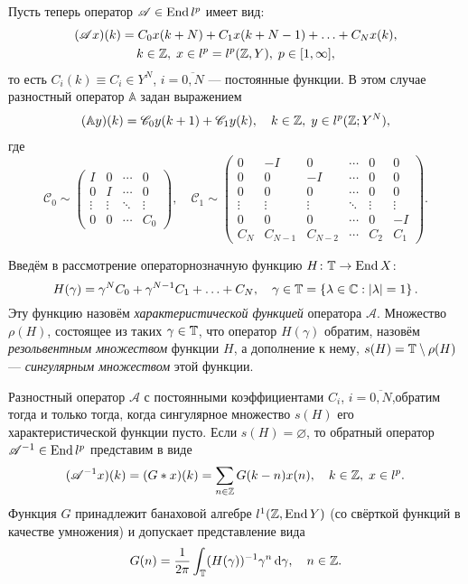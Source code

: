 Пусть теперь оператор $\mathcal A \in \operatorname{End}{l^p}$ имеет вид:
\begin{gather*}
    (\mathcal A x)(k) = C_0 x(k + N) + C_1 x(k + N - 1) + \dotsc + C_N x(k), \\
    k \in \mathbb{Z}, \; x \in l^p = l^p(\mathbb{Z}, Y), \; p \in [1, \infty],
\end{gather*}
то есть $C_i(k) \equiv C_i \in Y^N$, $i = \overline{0,N}$ --- постоянные функции. В этом случае разностный оператор $\mathbb A$ задан выражением
\begin{align*}
    (\mathbb A y)(k) = \mathcal C_0 y(k + 1) + \mathcal C_1 y(k), \quad k \in \mathbb{Z}, \; y \in l^p(\mathbb{Z}; Y^N),
\end{align*}
где
\[
    \mathcal C_0 \sim \begin{pmatrix}
    I & 0 & \cdots &  0 \\
    0 & I  & \cdots &  0 \\
    \vdots & \vdots & \ddots &  \vdots \\
    0 & 0 & \cdots &  C_0
   \end{pmatrix},\quad
   \mathcal C_1 \sim \begin{pmatrix}
    0 & -I & 0  & \cdots & 0 & 0 \\
    0 & 0  & -I & \cdots & 0 & 0 \\
    0 & 0  & 0 & \cdots & 0 & 0 \\
    \vdots & \vdots & \vdots & \ddots & \vdots & \vdots \\
    0 & 0 & 0 & \cdots & 0 & -I \\
    C_N & C_{N-1} & C_{N-2} & \cdots & C_2 & C_1
   \end{pmatrix}.
\]

Введём в рассмотрение операторнозначную функцию $H \colon \mathbb{T} \to \operatorname{End} X$:
\[ H(\gamma) = \gamma^N C_0 + \gamma^{N-1} C_1 + \dotsc + C_N, \quad \gamma \in \mathbb{T} = \left\{\lambda \in \mathbb{C} : \left|\lambda\right| = 1\right\}. \]
Эту функцию назовём \emph{характеристической функцией} оператора $ \mathcal A$. Множество $\rho(H)$, состоящее из таких $\gamma \in \mathbb{T}$, что оператор $H(\gamma)$ обратим, назовём \emph{резольвентным множеством} функции $H$, а дополнение к нему, $s(H) \hm= \groupt \setminus \rho(H)$ --- \emph{сингулярным множеством} этой функции.

\begin{theorem}\label{th:constant_inverse}
    Разностный оператор $\mathcal A$ с постоянными коэффициентами $C_i$, $i = \overline{0,N}$,обратим тогда и только тогда, когда сингулярное множество $s(H)$ его характеристической функции пусто. Если $s(H) = \varnothing$, то обратный оператор $\mathcal A^{-1} \in \operatorname{End} l^p$ представим в виде
    \begin{equation}\label{eq:invconst}
     (\mathcal A^{-1} x)(k) = (G * x)(k)= \sum_{n \in \mathbb{Z}} G(k - n) x(n), \quad k \in \mathbb{Z}, \; x \in l^p.
    \end{equation}
    Функция $G$ принадлежит банаховой алгебре $l^1(\mathbb{Z}, \operatorname{End} Y)$ (со свёрткой функций в качестве умножения) и допускает представление вида
    \[ G(n) = \frac{1}{2 \pi} \int_{\mathbb{T}} (H(\gamma))^{-1} \gamma^n \,\mathrm{d} \gamma, \quad n \in \mathbb{Z}. \]
\end{theorem}

